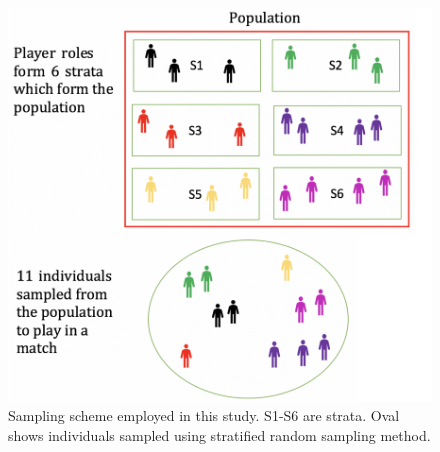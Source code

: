 \documentclass[12pt,A4]{article}
\begin{document}
 \begin{figure}[h]
	\centering
	\includegraphics[scale=0.70]{samplingscheme} 
	\caption{Sampling scheme employed in this study. S1-S6 are strata. Oval shows individuals sampled using stratified random sampling method. }
	\label{samplingscheme}
\end{figure}
\end{document}
